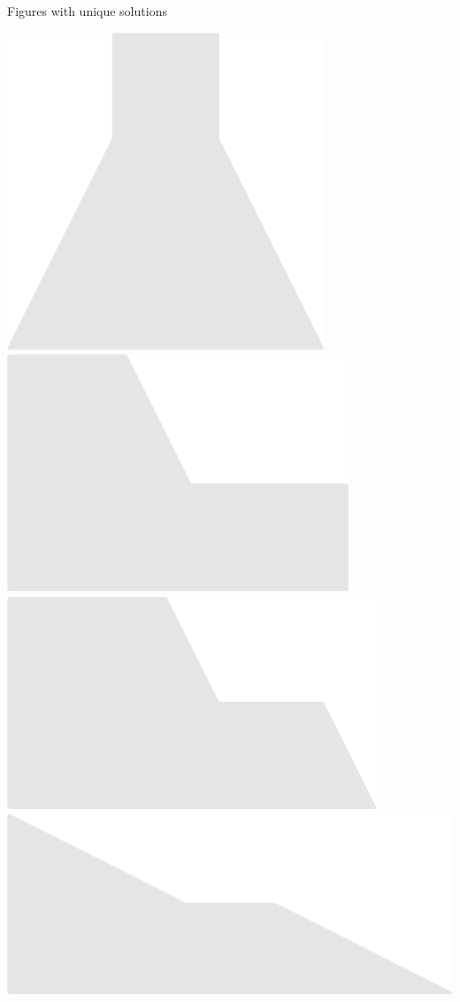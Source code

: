 \documentclass[14pt]{beamer}
\begin{document}
\begin{frame}{Figures with unique solutions}
\begin{center}
            \includegraphics[scale=0.40]{figures/figure022u.pdf} \\[4ex]
            \includegraphics[scale=0.40]{figures/figure022w.pdf}\quad
            \includegraphics[scale=0.40]{figures/figure022x.pdf}\quad
            \includegraphics[scale=0.40]{figures/figure022y.pdf} \\
            

\end{center}
\end{frame}
\end{document}
